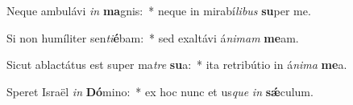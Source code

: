 \item Neque ambulávi \textit{in} \textbf{ma}gnis:~* neque in mirabí\textit{li}\textit{bus} \textbf{su}per me.
\item Si non humíliter sen\textit{ti}\textbf{é}bam:~* sed exaltávi á\textit{ni}\textit{mam} \textbf{me}am.
\item Sicut ablactátus est super ma\textit{tre} \textbf{su}a:~* ita retribútio in á\textit{ni}\textit{ma} \textbf{me}a.
\item Speret Israël \textit{in} \textbf{Dó}mino:~* ex hoc nunc et us\textit{que} \textit{in} \textbf{sǽ}culum.
